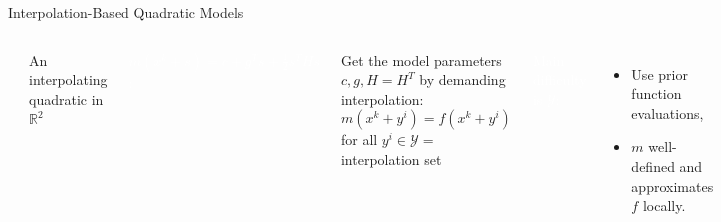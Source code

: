 \documentclass[handout,aspectratio=54]{beamer}
\numberwithin{theorem}{section}
\begin{document}
\begin{frame}{Interpolation-Based Quadratic Models}
\begin{columns}
\includegraphics[width=\textwidth]{fig/24.jpg}

\begin{center}
An interpolating quadratic in $\mathbb{R}^2$
\end{center}

\colorbox[rgb]{0.5,0.6,0.7}{\textcolor{white}{$m(x^k+s)=c+g^Ts+\frac{1}{2}s^THs$:}}

Get the model parameters $c,g,H = H^T$ by demanding interpolation:
\begin{equation*}
m(x^k+y^i)=f(x^k+y^i)
\end{equation*}
for all $y^i\in\mathcal{Y}=$ interpolation set

\colorbox[rgb]{0.5,0.6,0.7}{\textcolor{white}{Main difficulty is $\mathcal{Y}$:}}

\begin{itemize}
\item Use prior function evaluations,
\item $m$ well-defined and approximates $f$ locally.
\end{itemize}
\end{columns}
\end{frame}
\end{document}
